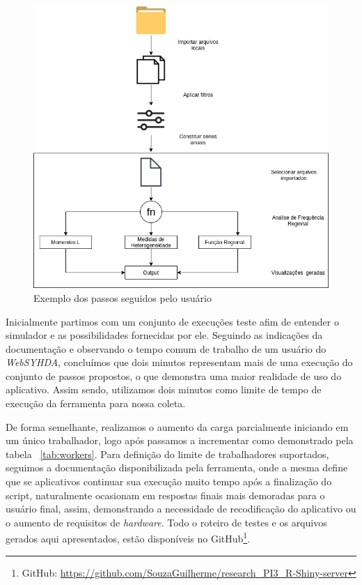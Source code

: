 \documentclass[12pt,english,brazil]{article}
\begin{document}
\begin{figure}[htbp]
  \centering 
  \includegraphics[scale=.4]{paperWSCAD2021/figures/useWebSYHDADrawio.png}
  \caption{Exemplo dos passos seguidos pelo usuário}
  \label{usoWebSYHDA}
\end{figure}

Inicialmente partimos com um conjunto de execuções teste afim de entender o simulador e as possibilidades fornecidas por ele. Seguindo as indicações da documentação e observando o tempo comum de trabalho de um usuário do \emph{WebSYHDA}, concluímos que %
dois minutos representam mais de uma execução do conjunto de passos propostos, o que demonstra uma maior realidade de uso do aplicativo. Assim sendo, utilizamos dois minutos como limite de tempo de execução da ferramenta para nossa coleta.




De forma semelhante, realizamos o aumento da carga parcialmente iniciando em um único trabalhador, logo após passamos a incrementar como demonstrado pela tabela ~\ref{tab:workers}. Para definição do limite de trabalhadores suportados, seguimos a documentação disponibilizada pela ferramenta, onde a mesma define que se aplicativos continuar sua execução muito tempo após a finalização do script, naturalmente ocasionam em respostas finais mais demoradas para o usuário final, assim, demonstrando a necessidade de recodificação do aplicativo ou o aumento de requisitos de \emph{hardware}. Todo o roteiro de testes e os arquivos gerados aqui apresentados, estão disponíveis no GitHub\footnote{GitHub: \url{https://github.com/SouzaGuilherme/research_PI3_R-Shiny-server}}.
\end{document}
